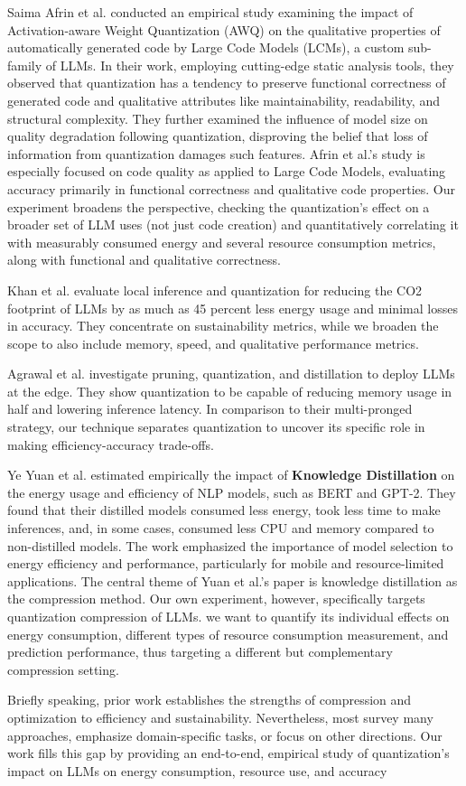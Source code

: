 Saima Afrin et al. \cite{DBLP:journals/corr/abs-2507-09665} conducted an empirical study examining the impact of Activation-aware Weight Quantization (AWQ) on the qualitative properties of automatically generated code by Large Code Models (LCMs), a custom sub-family of LLMs. In their work, employing cutting-edge static analysis tools, they observed that quantization has a tendency to preserve functional correctness of generated code and qualitative attributes like maintainability, readability, and structural complexity. They further examined the influence of model size on quality degradation following quantization, disproving the belief that loss of information from quantization damages such features. Afrin et al.'s study is especially focused on code quality as applied to Large Code Models, evaluating accuracy primarily in functional correctness and qualitative code properties. Our experiment broadens the perspective, checking the quantization's effect on a broader set of LLM uses (not just code creation) and quantitatively correlating it with measurably consumed energy and several resource consumption metrics, along with functional and qualitative correctness.

Khan et al. \cite{DBLP:journals/corr/abs-2504-06307} evaluate local inference and quantization for reducing the CO2 footprint of LLMs by as much as 45 percent less energy usage and minimal losses in accuracy. They concentrate on sustainability metrics, while we broaden the scope to also include memory, speed, and qualitative performance metrics.

Agrawal et al. \cite{10968787} investigate pruning, quantization, and distillation to deploy LLMs at the edge. They show quantization to be capable of reducing memory usage in half and lowering inference latency. In comparison to their multi-pronged strategy, our technique separates quantization to uncover its specific role in making efficiency-accuracy trade-offs.

Ye Yuan et al. \cite{DBLP:conf/cain/YuanSZCZSM24} estimated empirically the impact of \textbf{Knowledge Distillation} on the energy usage and efficiency of NLP models, such as BERT and GPT-2. They found that their distilled models consumed less energy, took less time to make inferences, and, in some cases, consumed less CPU and memory compared to non-distilled models. The work emphasized the importance of model selection to energy efficiency and performance, particularly for mobile and resource-limited applications. The central theme of Yuan et al.'s paper \cite{DBLP:conf/cain/YuanSZCZSM24} is knowledge distillation as the compression method. Our own experiment, however, specifically targets quantization compression of LLMs. we want to quantify its individual effects on energy consumption, different types of resource consumption measurement, and prediction performance, thus targeting a different but complementary compression setting.

Briefly speaking, prior work establishes the strengths of compression and optimization to efficiency and sustainability. Nevertheless, most survey many approaches, emphasize domain-specific tasks, or focus on other directions. Our work fills this gap by providing an end-to-end, empirical study of quantization's impact on LLMs on energy consumption, resource use, and accuracy